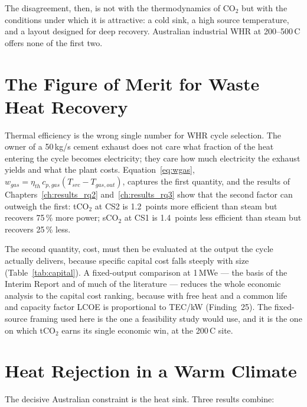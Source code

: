 \documentclass[12pt,a4paper]{report}
\begin{document}
The disagreement, then, is not with the thermodynamics of CO$_2$ but with
the conditions under which it is attractive: a cold sink, a high source
temperature, and a layout designed for deep recovery. Australian industrial
WHR at 200--500\,\textdegree C offers none of the first two.

\section{The Figure of Merit for Waste Heat Recovery}
\label{sec:discussion_fom}

Thermal efficiency is the wrong single number for WHR cycle selection. The
owner of a 50\,kg/s cement exhaust does not care what fraction of the
heat entering the cycle becomes electricity; they care how much electricity
the exhaust yields and what the plant costs. Equation~\eqref{eq:wgas},
$w_{gas} = \eta_{th}\,c_{p,gas}(T_{src} - T_{gas,out})$, captures the first
quantity, and the results of Chapters~\ref{ch:results_rq2}
and~\ref{ch:results_rq3} show that the second factor can outweigh the
first: tCO$_2$ at CS2 is 1.2~points more efficient than steam but recovers
75\,\% more power; sCO$_2$ at CS1 is 1.4~points less efficient than steam but
recovers 25\,\% less.

The second quantity, cost, must then be evaluated at the output the cycle
actually delivers, because specific capital cost falls steeply with size
(Table~\ref{tab:capital}). A fixed-output comparison at 1\,MWe --- the basis
of the Interim Report and of much of the literature --- reduces the whole
economic analysis to the capital cost ranking, because with free heat and a
common life and capacity factor LCOE is proportional to TEC/kW
(Finding~25). The fixed-source framing used here is the one a feasibility
study would use, and it is the one on which tCO$_2$ earns its single
economic win, at the 200\,\textdegree C site.

\section{Heat Rejection in a Warm Climate}
\label{sec:discussion_australian}

The decisive Australian constraint is the heat sink. Three results combine:
\end{document}
